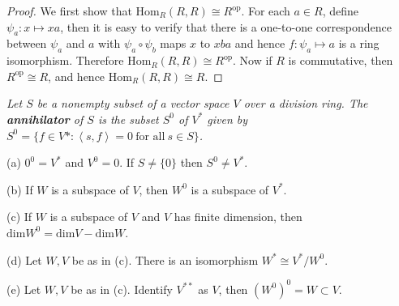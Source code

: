 \begin{proof}
We first show that $\mathrm{Hom}_R(R,R)\cong R^{\mathrm{op}}$. For each $a\in R$, define $\psi_a:x\mapsto xa$, then it is easy to verify that there is a one-to-one correspondence between $\psi_a$ and $a$ with $\psi_a\circ\psi_b$ maps $x$ to $xba$ and hence $f:\psi_a\mapsto a$ is a ring isomorphism. Therefore $\mathrm{Hom}_R(R,R)\cong R^{\mathrm{op}}$. Now if $R$ is commutative, then $R^{\mathrm{op}}\cong R$, and hence $\mathrm{Hom}_R(R,R)\cong R$.
\end{proof}
\begin{problem}\em
Let $S$ be a nonempty subset of a vector space $V$ over a division ring. The \textbf{annihilator} of $S$ is the subset $S^0$ of $V^*$ given by $S^0=\{f\in V*:\left<s,f\right>=0\ \text{for all}\ s\in S\}$.\par
(a) $0^0=V^*$ and $V^0=0$. If $S\ne \{0\}$ then $S^0\ne V^*$.\par
(b) If $W$ is a subspace of $V$, then $W^0$ is a subspace of $V^*$.\par
(c) If $W$ is a subspace of $V$ and $V$ has finite dimension, then $\mathrm{dim}W^0=\mathrm{dim}V-\mathrm{dim}W$.\par
(d) Let $W,V$ be as in (c). There is an isomorphism $W^*\cong V^*/W^0$.\par
(e) Let $W,V$ be as in (c). Identify $V^{**}$ as $V$, then $(W^0)^0=W\subset V$.
\end{problem}

